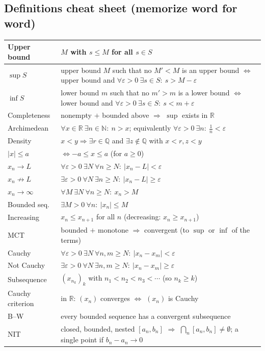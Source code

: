 \documentclass[11pt]{article}
\theoremstyle{definition}
\newcommand{\N}{\mathbb{N}}
\newcommand{\Q}{\mathbb{Q}}
\newcommand{\R}{\mathbb{R}}
\newcommand{\eps}{\varepsilon}
\begin{document}
\subsection*{Definitions cheat sheet (memorize word for word)}
\begin{center}
\renewcommand{\arraystretch}{1.35}
\begin{tabular}{|p{3.4cm}|p{11.2cm}|}
\hline
Upper bound & $M$ with $s\le M$ for all $s\in S$\\ \hline
$\sup S$ & upper bound $M$ such that no $M'<M$ is an upper bound
$\iff$ upper bound and $\forall\eps>0\ \exists s\in S:\ s>M-\eps$\\ \hline
$\inf S$ & lower bound $m$ such that no $m'>m$ is a lower bound $\iff$
lower bound and $\forall\eps>0\ \exists s\in S:\ s<m+\eps$\\ \hline
Completeness & nonempty $+$ bounded above $\Rightarrow$ $\sup$ exists in $\R$\\ \hline
Archimedean & $\forall x\in\R\ \exists n\in\N:\ n>x$; equivalently $\forall\eps>0\ \exists n:\ \frac1n<\eps$\\ \hline
Density & $x<y\Rightarrow\exists r\in\Q$ and $\exists z\notin\Q$ with $x<r,z<y$\\ \hline
$|x|\le a$ & $\iff -a\le x\le a$ (for $a\ge0$)\\ \hline
$x_n\to L$ & $\forall\eps>0\ \exists N\ \forall n\ge N:\ |x_n-L|<\eps$\\ \hline
$x_n\not\to L$ & $\exists\eps>0\ \forall N\ \exists n\ge N:\ |x_n-L|\ge\eps$\\ \hline
$x_n\to\infty$ & $\forall M\ \exists N\ \forall n\ge N:\ x_n>M$\\ \hline
Bounded seq. & $\exists M>0\ \forall n:\ |x_n|\le M$\\ \hline
Increasing & $x_n\le x_{n+1}$ for all $n$ \quad (decreasing: $x_n\ge x_{n+1}$)\\ \hline
MCT & bounded $+$ monotone $\Rightarrow$ convergent (to $\sup$ or $\inf$ of the terms)\\ \hline
Cauchy & $\forall\eps>0\ \exists N\ \forall n,m\ge N:\ |x_n-x_m|<\eps$\\ \hline
Not Cauchy & $\exists\eps>0\ \forall N\ \exists n,m\ge N:\ |x_n-x_m|\ge\eps$\\ \hline
Subsequence & $(x_{n_k})_k$ with $n_1<n_2<n_3<\cdots$ (so $n_k\ge k$)\\ \hline
Cauchy criterion & in $\R$: $(x_n)$ converges $\iff$ $(x_n)$ is Cauchy\\ \hline
B--W & every bounded sequence has a convergent subsequence\\ \hline
NIT & closed, bounded, nested $[a_n,b_n]$ $\Rightarrow$ $\bigcap_n[a_n,b_n]\ne\emptyset$; a single point if $b_n-a_n\to0$\\ \hline
\end{tabular}
\end{center}
\end{document}
